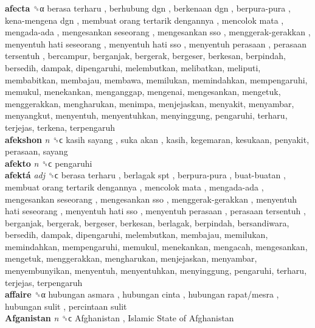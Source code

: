 \textbf{afecta} ␝α   berasa terharu ,  berhubung dgn ,  berkenaan dgn ,  berpura-pura ,  kena-mengena dgn ,  membuat orang tertarik dengannya ,  mencolok mata ,  mengada-ada ,  mengesankan seseorang ,  mengesankan sso ,  menggerak-gerakkan ,  menyentuh hati seseorang ,  menyentuh hati sso ,  menyentuh perasaan ,  perasaan tersentuh , bercampur, berganjak, bergerak, bergeser, berkesan, berpindah, bersedih, dampak, dipengaruhi, melembutkan, melibatkan, meliputi, membabitkan, membajau, membawa, memilukan, memindahkan, mempengaruhi, memukul, menekankan, menganggap, mengenai, mengesankan, mengetuk, menggerakkan, mengharukan, menimpa, menjejaskan, menyakit, menyambar, menyangkut, menyentuh, menyentuhkan, menyinggung, pengaruhi, terharu, terjejas, terkena, terpengaruh  \\
\textbf{afekshon} \emph{n}  ␝ϲ   kasih sayang ,  suka akan , kasih, kegemaran, kesukaan, penyakit, perasaan, sayang  \\
\textbf{afekto} \emph{n}  ␝ϲ  pengaruhi  \\
\textbf{afektá} \emph{adj}  ␝ϲ   berasa terharu ,  berlagak spt ,  berpura-pura ,  buat-buatan ,  membuat orang tertarik dengannya ,  mencolok mata ,  mengada-ada ,  mengesankan seseorang ,  mengesankan sso ,  menggerak-gerakkan ,  menyentuh hati seseorang ,  menyentuh hati sso ,  menyentuh perasaan ,  perasaan tersentuh , berganjak, bergerak, bergeser, berkesan, berlagak, berpindah, bersandiwara, bersedih, dampak, dipengaruhi, melembutkan, membajau, memilukan, memindahkan, mempengaruhi, memukul, menekankan, mengacah, mengesankan, mengetuk, menggerakkan, mengharukan, menjejaskan, menyambar, menyembunyikan, menyentuh, menyentuhkan, menyinggung, pengaruhi, terharu, terjejas, terpengaruh  \\
\textbf{affaire} ␝α   hubungan asmara ,  hubungan cinta ,  hubungan rapat/mesra ,  hubungan sulit ,  percintaan sulit   \\
\textbf{Afganistan} \emph{n}  ␝ϲ   Afghanistan ,  Islamic State of Afghanistan   \\
